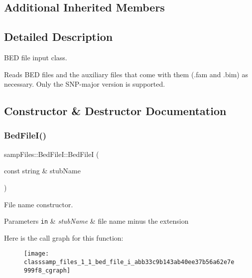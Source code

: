 \subsection*{Additional Inherited Members}


\subsection{Detailed Description}
B\+ED file input class. 

Reads B\+ED files and the auxiliary files that come with them (.fam and .bim) as necessary. Only the S\+N\+P-\/major version is supported. 

\subsection{Constructor \& Destructor Documentation}
\mbox{\label{classsamp_files_1_1_bed_file_i_abb33c9b143ab40ee37b56a62e7e999f8}} 
\subsubsection{\texorpdfstring{Bed\+File\+I()}{BedFileI()}}
{\footnotesize\ttfamily samp\+Files\+::\+Bed\+File\+I\+::\+Bed\+FileI (\begin{DoxyParamCaption}\item[{const string \&}]{stub\+Name }\end{DoxyParamCaption})\hspace{0.3cm}{\ttfamily [inline]}}



File name constructor. 


\begin{DoxyParams}[1]{Parameters}
\mbox{\tt in}  & {\em stub\+Name} & file name minus the extension \\
\hline
\end{DoxyParams}
Here is the call graph for this function\+:\nopagebreak
\begin{figure}[H]
\begin{center}
\leavevmode
\texttt{[image: classsamp\_files\_1\_1\_bed\_file\_i\_abb33c9b143ab40ee37b56a62e7e999f8\_cgraph]}
\end{center}
\end{figure}


